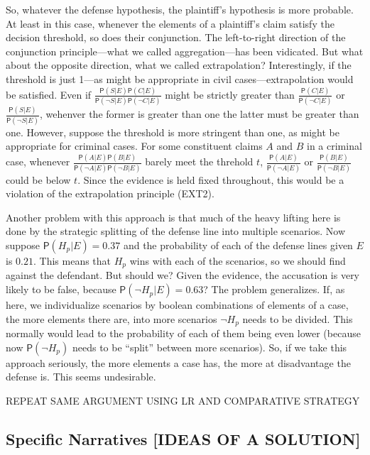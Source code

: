 \documentclass[10pt,dvipsnames,enabledeprecatedfontcommands]{scrartcl}
\newcommand{\n}{\neg}
\newcommand{\pr}[1]{\mathsf{P}(#1)}
\begin{document}
\noindent So, whatever the defense hypothesis, the plaintiff's
hypothesis is more probable. At least in this case, whenever the
elements of a plaintiff's claim satisfy the decision threshold, so does
their conjunction. The left-to-right direction of the conjunction
principle---what we called aggregation---has been vidicated. But what
about the opposite direction, what we called extrapolation?
Interestingly, if the threshold is just 1---as might be appropriate in
civil cases---extrapolation would be satisfied. Even if
\(\frac{\pr{S\vert E}\pr{C\vert E}}{\pr{\n S \vert E}\pr{\n C \vert E}}\)
might be strictly greater than
\(\frac{\pr{C\vert E}}{\pr{\n C \vert E}}\) or
\(\frac{\pr{S\vert E}}{\pr{\n S \vert E}}\), wehenver the former is
greater than one the latter must be greater than one. However, suppose
the threshold is more stringent than one, as might be appropriate for
criminal cases. For some constituent claims \(A\) and \(B\) in a
criminal case, whenever
\(\frac{\pr{A\vert E}\pr{B\vert E}}{\pr{\n A \vert E}\pr{\n B \vert E}}\)
barely meet the threhold \(t\),
\(\frac{\pr{A\vert E}}{\pr{\n A \vert E}}\) or
\(\frac{\pr{B\vert E}}{\pr{\n B \vert E}}\) could be below \(t\). Since
the evidence is held fixed throughout, this would be a violation of the
extrapolation principle (EXT2).

Another problem with this approach is that much of the heavy lifting
here is done by the strategic splitting of the defense line into
multiple scenarios. Now suppose \(\pr{H_p\vert E}=0.37\) and the
probability of each of the defense lines given \(E\) is \(0.21\). This
means that \(H_p\) wins with each of the scenarios, so we should find
against the defendant. But should we? Given the evidence, the accusation
is very likely to be false, because \(\pr{\n H_p \vert E}=0.63\)? The
problem generalizes. If, as here, we individualize scenarios by boolean
combinations of elements of a case, the more elements there are, into
more scenarios \(\n H_p\) needs to be divided. This normally would lead
to the probability of each of them being even lower (because now
\(\pr{\n H_p}\) needs to be ``split'' between more scenarios). So, if we
take this approach seriously, the more elements a case has, the more at
disadvantage the defense is. This seems undesirable.

REPEAT SAME ARGUMENT USING LR AND COMPARATIVE STRATEGY

\hypertarget{specific-narratives-ideas-of-a-solution}{%
\subsection{Specific Narratives {[}IDEAS OF A
SOLUTION{]}}\label{specific-narratives-ideas-of-a-solution}}
\end{document}
